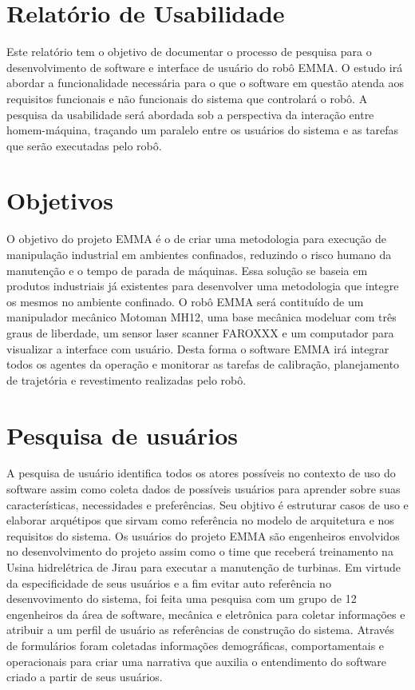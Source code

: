 \documentclass[12pt,a4paper]{article}
\begin{document}


\tableofcontents



\section{Relatório de Usabilidade}

Este relatório tem o objetivo de documentar o processo de pesquisa para o desenvolvimento de software e
interface de usuário do robô EMMA. O estudo irá abordar a funcionalidade necessária para o que o software
em questão atenda aos requisitos funcionais e não funcionais do sistema que controlará o robô. A pesquisa
da usabilidade será abordada sob a perspectiva da interação entre homem-máquina, traçando um paralelo 
entre os usuários do sistema e as tarefas que serão executadas pelo robô.

\section{Objetivos}

O objetivo do projeto EMMA é o de criar uma metodologia para execução de manipulação industrial em ambientes
confinados, reduzindo o risco humano da manutenção e o tempo de parada de máquinas. Essa solução se baseia 
em produtos industriais já existentes para desenvolver uma metodologia que integre os mesmos no ambiente 
confinado. 
O robô EMMA será contituído de um manipulador mecânico Motoman MH12,
uma base mecânica modeluar com três graus de liberdade, um sensor laser scanner FAROXXX e um computador 
para visualizar a interface com usuário. Desta forma o software EMMA irá integrar todos os agentes da operação 
e monitorar as tarefas de calibração, planejamento de trajetória e revestimento realizadas pelo robô.

\section{Pesquisa de usuários}
A pesquisa de usuário identifica todos os atores possíveis no contexto de uso do software 
assim como coleta dados de possíveis usuários para aprender sobre suas características, 
necessidades e preferências. Seu objtivo é estruturar casos de uso e elaborar arquétipos que
sirvam como referência no modelo de arquitetura e nos requisitos do sistema.
Os usuários do projeto EMMA são engenheiros envolvidos no desenvolvimento do projeto assim como 
o time que receberá treinamento na Usina hidrelétrica de Jirau para executar a manutenção de turbinas. 
Em virtude da especificidade de seus usuários e a fim evitar auto referência no desenvovimento do 
sistema, foi feita uma pesquisa com um grupo de 12 engenheiros da área de software, mecânica e
eletrônica para coletar informações e atribuir a um perfil de usuário as referências de construção
do sistema. Através de formulários foram coletadas informações demográficas, comportamentais e 
operacionais para criar uma narrativa que auxilia o entendimento do software criado a partir de 
seus usuários.
\end{document}

